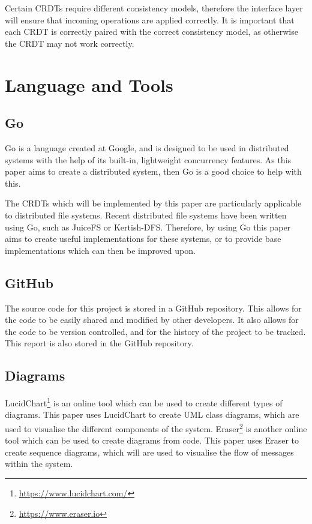 \documentclass[12pt]{report}
\begin{document}
Certain CRDTs require different consistency models, therefore the interface layer will ensure that incoming operations are applied correctly. It is important that each CRDT is correctly paired with the correct consistency model, as otherwise the CRDT may not work correctly. \par

\section{Language and Tools}
\subsection{Go}
Go is a language created at Google, and is designed to be used in distributed systems with the help of its built-in, lightweight concurrency features. As this paper aims to create a distributed system, then Go is a good choice to help with this. \par

The CRDTs which will be implemented by this paper are particularly applicable to distributed file systems. Recent distributed file systems have been written using Go, such as JuiceFS or Kertish-DFS. Therefore, by using Go this paper aims to create useful implementations for these systems, or to provide base implementations which can then be improved upon. \par


\subsection{GitHub}
The source code for this project is stored in a GitHub repository. This allows for the code to be easily shared and modified by other developers. It also allows for the code to be version controlled, and for the history of the project to be tracked. This report is also stored in the GitHub repository. \par

\subsection{Diagrams}
LucidChart\footnote{\url{https://www.lucidchart.com/}} is an online tool which can be used to create different types of diagrams. This paper uses LucidChart to create UML class diagrams, which are used to visualise the different components of the system. Eraser\footnote{\url{https://www.eraser.io}} is another online tool which can be used to create diagrams from code. This paper uses Eraser to create sequence diagrams, which will are used to visualise the flow of messages within the system. \par
\end{document}
